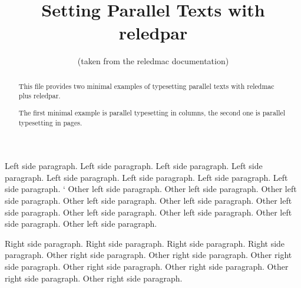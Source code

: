 \documentclass{article}
\begin{document}
\date{(taken from the reledmac documentation)}
\title{Setting Parallel Texts with reledpar}
\maketitle

\begin{abstract}
This file provides two minimal examples of typesetting parallel texts with reledmac plus reledpar. 

The first minimal example is parallel typesetting in columns, the second one is parallel typesetting in pages.
\end{abstract}


\begin{pairs}
    \begin{Leftside}
        \beginnumbering
            \pstart
                Left side paragraph. Left side paragraph. Left side paragraph. Left side paragraph. Left side paragraph. Left side paragraph. Left side paragraph. Left side paragraph.
            \pend
            \pstart`
                Other left side paragraph.  Other left side paragraph.  Other left side paragraph.  Other left side paragraph.  Other left side paragraph.  Other left side paragraph.  Other left side paragraph.  Other left side paragraph.  Other left side paragraph.  Other left side paragraph.
            \pend
        \endnumbering
    \end{Leftside}
    \begin{Rightside}
        \beginnumbering
            \pstart
                Right side paragraph. Right side paragraph. Right side paragraph. Right side paragraph.
            \pend
            \pstart
                Other right side paragraph. Other right side paragraph. Other right side paragraph. Other right side paragraph. Other right side paragraph. Other right side paragraph. Other right side paragraph.
            \pend
        \endnumbering
    \end{Rightside}

\end{pairs} 
\Columns
\end{document}
